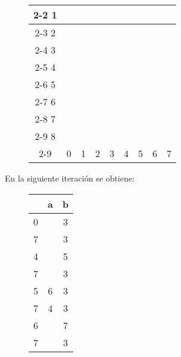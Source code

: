 \documentclass[11pt,a4paper]{article}
\begin{document}
		\begin{figure}[H]
			\centering
			\begin{tabular}{*{9}{c|}}
																							\cline{2-2}
				1 & \color{blue}{X}															\\ \cline{2-3}
				2 & \color{blue}{X} &														\\ \cline{2-4}
				3 & \color{blue}{X} & &											\\ \cline{2-5}
				4 & & \color{blue}{X} & \color{blue}{X} & \color{blue}{X}	\\ \cline{2-6}
				5 & & \color{blue}{X} & \color{blue}{X} & \color{blue}{X} & \\ \cline{2-7}
				6 & & \color{blue}{X} & \color{blue}{X} & \color{blue}{X} & & \\ \cline{2-8}
				7 & & \color{blue}{X} & \color{blue}{X} & \color{blue}{X} & & & \\ \cline{2-9}
				8 & \color{blue}{X} & \color{red}{X} & \color{red}{X} & \color{red}{X} & \color{blue}{X} & \color{blue}{X} &
					\color{blue}{X} & \color{blue}{X} \\ \cline{2-9}
				\multicolumn{0}{c}{} & \multicolumn{1}{c}{0} & \multicolumn{1}{c}{1} & \multicolumn{1}{c}{2}
				& \multicolumn{1}{c}{3} & \multicolumn{1}{c}{4} & \multicolumn{1}{c}{5} & \multicolumn{1}{c}{6}
				& \multicolumn{1}{c}{7}
			\end{tabular}
		\end{figure}
		
		En la siguiente iteración se obtiene:
		
		\begin{figure}[H]
			\centering
			\begin{tabular}{c|cc}
				& a & b		\\ \hline
				0 & \color{red}{1} & 3	\\
				7 & \color{red}{4} & 3	\\ \hline
				4 & \color{red}{1} & 5	\\
				7 & \color{red}{4} & 3	\\ \hline
				5 & 6 & 3	\\
				7 & 4 & 3	\\ \hline
				6 & \color{red}{1} & 7	\\
				7 & \color{red}{4} & 3	\\ \hline				
			\end{tabular}
		\end{figure}
		
\end{document}
